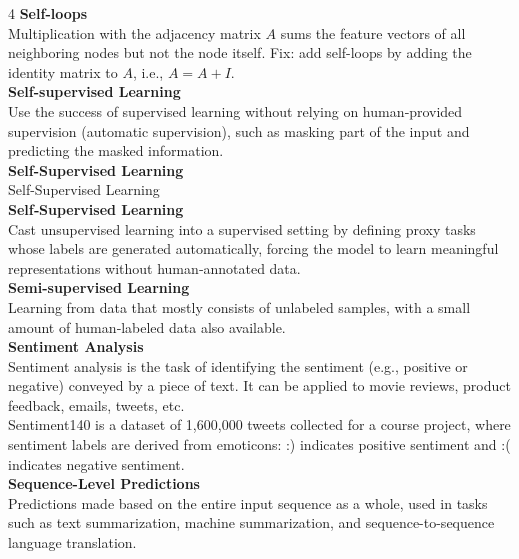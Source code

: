\documentclass[8pt]{extarticle}
\begin{document}
\begin{multicols}{4}
\vspace{2pt}\textbf{Self-loops}\\
Multiplication with the adjacency matrix $A$ sums the feature vectors of all neighboring nodes but not the node itself. Fix: add self-loops by adding the identity matrix to $A$, i.e., $A = A + I$.\\
\vspace{2pt}\textbf{Self-supervised Learning}\\
Use the success of supervised learning without relying on human‑provided supervision (automatic supervision), such as masking part of the input and predicting the masked information.\\
\vspace{2pt}\textbf{Self-Supervised Learning}\\
Self-Supervised Learning\\
\vspace{2pt}\textbf{Self‑Supervised Learning}\\
Cast unsupervised learning into a supervised setting by defining proxy tasks whose labels are generated automatically, forcing the model to learn meaningful representations without human‑annotated data.\\
\vspace{2pt}\textbf{Semi-supervised Learning}\\
Learning from data that mostly consists of unlabeled samples, with a small amount of human‑labeled data also available.\\
\vspace{2pt}\textbf{Sentiment Analysis}\\
Sentiment analysis is the task of identifying the sentiment (e.g., positive or negative) conveyed by a piece of text. It can be applied to movie reviews, product feedback, emails, tweets, etc.\\
Sentiment140 is a dataset of 1,600,000 tweets collected for a course project, where sentiment labels are derived from emoticons: :) indicates positive sentiment and :( indicates negative sentiment.\\
\vspace{2pt}\textbf{Sequence-Level Predictions}\\
Predictions made based on the entire input sequence as a whole, used in tasks such as text summarization, machine summarization, and sequence-to-sequence language translation.\\


\end{multicols}
\end{document}
